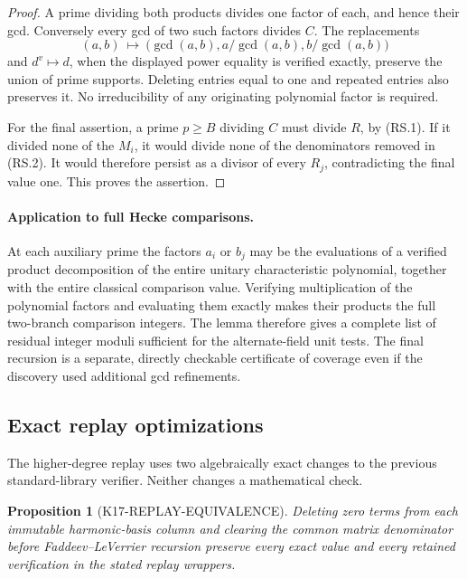 \documentclass[11pt,a4paper]{article}
\newtheorem{proposition}[theorem]{Proposition}
\theoremstyle{definition}
\begin{document}
\begin{proof}
A prime dividing both products divides one factor of each,
and hence their gcd. Conversely every gcd of two such factors
divides \(C\). The replacements
\[
 (a,b)\ \longmapsto\
 \bigl(\gcd(a,b),a/\gcd(a,b),b/\gcd(a,b)\bigr)
\]
and \(d^v\mapsto d\), when the displayed power equality is
verified exactly, preserve the union of prime supports.
Deleting entries equal to one and repeated entries also
preserves it. No irreducibility of any originating polynomial
factor is required.

For the final assertion, a prime \(p\ge B\) dividing \(C\)
must divide \(R\), by (RS.1). If it divided none of the \(M_i\),
it would divide none of the denominators removed in (RS.2).
It would therefore persist as a divisor of every \(R_j\),
contradicting the final value one. This proves the assertion.
\end{proof}

\paragraph{Application to full Hecke comparisons.}
At each auxiliary prime the factors \(a_i\) or \(b_j\) may be
the evaluations of a verified product decomposition of the
entire unitary characteristic polynomial, together with the
entire classical comparison value. Verifying multiplication
of the polynomial factors and evaluating them exactly makes
their products the full two-branch comparison integers.
The lemma therefore gives a complete list of residual
integer moduli sufficient for the alternate-field unit tests.
The final recursion is a separate, directly checkable
certificate of coverage even if the discovery used additional
gcd refinements.

\subsection{Exact replay optimizations}
\label{sec:higher4-replay-equivalence}

The higher-degree replay uses two algebraically exact changes to the
previous standard-library verifier. Neither changes a mathematical check.

\begin{proposition}[K17-REPLAY-EQUIVALENCE]
Deleting zero terms from each immutable harmonic-basis column and
clearing the common matrix denominator before Faddeev--LeVerrier
recursion preserve every exact value and every retained verification
in the stated replay wrappers.
\end{proposition}
\end{document}
